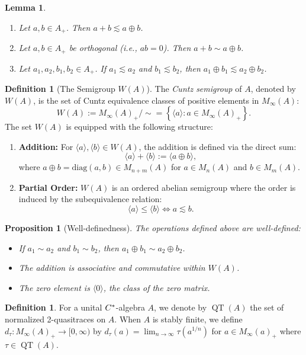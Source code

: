 \documentclass[12pt]{amsart}
\theoremstyle{plain}
\newtheorem{lem}[thm]{Lemma}
\newtheorem{prop}[thm]{Proposition}
\theoremstyle{definition}
\newtheorem{defn}[thm]{Definition}
\def\QT{\operatorname{QT}}
\numberwithin{equation}{section}
\begin{document}
\begin{lem}
\begin{enumerate}
\begin{enumerate}
        \item For every $\varepsilon > 0$, there exists $\delta > 0$ such that $(a - \varepsilon)_{+} \lesssim (b - \delta)_+$.
    \end{enumerate}
    \item Let $a, b \in A_+$. Then $a + b \lesssim a \oplus b$.
    \item Let $a, b \in A_+$ be orthogonal (i.e., $ab = 0$). Then $a + b \sim a \oplus b$.
    \item Let $a_1, a_2, b_1, b_2 \in A_+$. If $a_1 \lesssim a_2$ and $b_1 \lesssim b_2$, then $a_1 \oplus b_1 \lesssim a_2 \oplus b_2$.
\end{enumerate}
\end{lem}
\begin{defn}[The Semigroup $W(A)$]
The \textit{Cuntz semigroup} of $A$, denoted by $W(A)$, is the set of Cuntz equivalence classes of positive elements in $M_{\infty}(A)$:
\[ W(A) := M_{\infty}(A)_+ / \sim = \left\{ \langle a \rangle : a \in M_{\infty}(A)_+ \right\}. \]
The set $W(A)$ is equipped with the following structure:
\begin{enumerate}
    \item \textbf{Addition:} For $\langle a \rangle, \langle b \rangle \in W(A)$, the addition is defined via the direct sum:
    \[ \langle a \rangle + \langle b \rangle := \langle a \oplus b \rangle, \]
    where $a \oplus b = \text{diag}(a, b) \in M_{n+m}(A)$ for $a \in M_n(A)$ and $b \in M_m(A)$.
    \item \textbf{Partial Order:} $W(A)$ is an ordered abelian semigroup where the order is induced by the subequivalence relation:
    \[ \langle a \rangle \le \langle b \rangle \iff a \lesssim b. \]
\end{enumerate}
\end{defn}

\begin{prop}[Well-definedness]
The operations defined above are well-defined:
\begin{itemize}
    \item If $a_1 \sim a_2$ and $b_1 \sim b_2$, then $a_1 \oplus b_1 \sim a_2 \oplus b_2$.
    \item The addition is associative and commutative within $W(A)$.
    \item The zero element is $\langle 0 \rangle$, the class of the zero matrix.
\end{itemize}
\end{prop}

\begin{defn}\label{D:dimensionfunction}
For a unital $C\sp*$-algebra $A$, we denote by $\QT(A)$ the set of normalized 2-quasitraces on $A$. When $A$ is stably finite, we define $d_{\tau}: M_{\infty}(A)_{+} \to [0, \infty)$  by $d_{\tau}(a)=\lim_{n \to \infty} \tau(a^{1/n})$ for $a \in M_{\infty}(a)_{+}$ where $\tau \in \QT(A)$. 
\end{defn}
\end{document}
